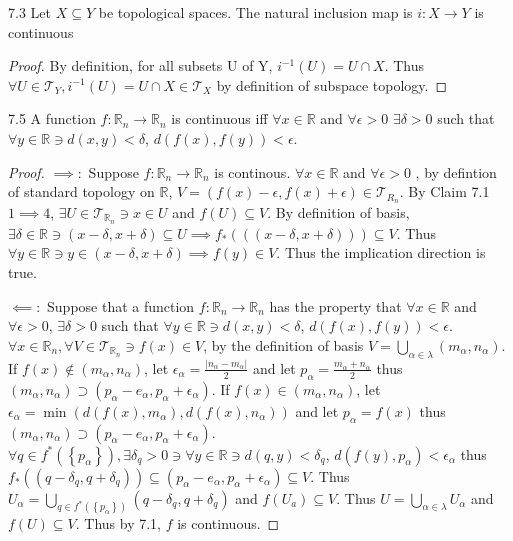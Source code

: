\documentclass{article}
\newcommand*{\T}{\mathcal{T}}
\newcommand*{\subeq}{\subseteq}
\newcommand{\R}{\mathbb{R}}
\newcommand{\abs}[1]{\left\lvert #1\right\rvert}
\begin{document}
\bigskip

\begin{claim}{7.3}\label{Claim 7.3.}
    Let $X \subeq Y$ be topological spaces. The natural inclusion map is $i: X \to Y$ is continuous   
\end{claim}
\begin{proof}
    By definition, for all subsets U of Y, $i^{-1}(U) = U \cap X$. Thus $\forall U \in \T_Y, i^{-1}(U) = U \cap X \in \T_X$ by definition of subspace topology.     
\end{proof}


\bigskip

\begin{claim}{7.5}\label{Claim 7.5.}
    A function $f: \R_n \to \R_n$ is continuous iff $\forall x \in \R$ and $\forall \epsilon > 0$ $\exists \delta > 0$ such that $\forall y \in \R \ni d(x, y) < \delta$, $d(f(x), f(y)) < \epsilon$.       
\end{claim}
\begin{proof}
    $\implies:$ Suppose $f: \R_n \to \R_n$ is continous. $\forall x \in \R$ and $\forall \epsilon > 0$ , by defintion of standard topology on $\R$, $V = (f(x) - \epsilon, f(x) + \epsilon) \in \T_{R_n}$. By Claim 7.1 $1 \implies 4$, $\exists U \in \T_{\R_n} \ni x \in U$ and $f(U) \subseteq V$. By definition of basis, $\exists \delta \in \R \ni (x - \delta, x + \delta) \subseteq U \implies f_*(((x - \delta, x + \delta))) \subseteq V$. Thus $\forall y \in \R \ni y \in (x - \delta, x + \delta) \implies f(y) \in V$. Thus the implication direction is true.
    
    $\impliedby:$ Suppose that a function $f: \R_n \to \R_n$ has the property that $\forall x \in \R$ and $\forall \epsilon > 0$, $\exists \delta > 0$ such that $\forall y \in \R \ni d(x, y) < \delta$, $d(f(x), f(y)) < \epsilon$. $\forall x \in \R_{n}, \forall V \in \T_{\R_n} \ni f(x) \in V$, by the definition of basis $V = \bigcup_{\alpha \in \lambda} (m_\alpha, n_\alpha)$. If $f(x) \not \in (m_\alpha, n_\alpha)$, let $\epsilon_{\alpha} = \frac{\abs{n_{\alpha} - m_{\alpha}}}{2}$ and let $p_{\alpha} = \frac{m_{\alpha} + n_{\alpha}}{2}$ thus $(m_{\alpha}, n_{\alpha}) \supset (p_{\alpha} - e_{\alpha}, p_{\alpha} + \epsilon_{\alpha})$. If $f(x) \in (m_\alpha, n_\alpha)$, let $\epsilon_{\alpha} = \min(d(f(x), m_\alpha), d(f(x), n_\alpha))$ and let $p_{\alpha} = f(x)$ thus $(m_{\alpha}, n_{\alpha}) \supset (p_{\alpha} - e_{\alpha}, p_{\alpha} + \epsilon_{\alpha})$. $\forall q \in f^{*}(\left\{ p_{\alpha} \right\}), \exists \delta_{q} > 0 \ni \forall y \in \R \ni d(q, y) < \delta_{q}$, $d(f(y), p_\alpha) < \epsilon_{\alpha}$ thus $f_*((q - \delta_q, q + \delta_q)) \subseteq (p_{\alpha} - e_{\alpha}, p_{\alpha} + \epsilon_{\alpha}) \subseteq V$. Thus $U_{\alpha} = \bigcup_{q \in f^*(\left\{ p_\alpha \right\})} (q - \delta_q, q + \delta_q)$ and $f(U_a) \subseteq V$. Thus $U = \bigcup_{\alpha \in \lambda} U_\alpha$ and $f(U) \subseteq V$. Thus by 7.1, $f$ is continuous.               
\end{proof}
\end{document}
